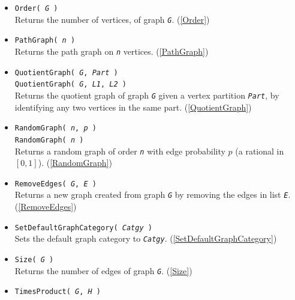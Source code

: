 \documentclass[a4paper,11pt]{report}
\begin{document}
{{\begin{itemize}
 Returns the minimum degree in graph \mbox{\texttt{\mdseries\slshape G}}. (\ref{MinDegree}) 
\item \texttt{Order( \mbox{\texttt{\mdseries\slshape G}} )}\\
 Returns the number of vertices, of graph \mbox{\texttt{\mdseries\slshape G}}. (\ref{Order}) 
\item \texttt{PathGraph( \mbox{\texttt{\mdseries\slshape n}} )}\\
 Returns the path graph on \mbox{\texttt{\mdseries\slshape n}} vertices. (\ref{PathGraph}) 
\item \texttt{QuotientGraph( \mbox{\texttt{\mdseries\slshape G}}, \mbox{\texttt{\mdseries\slshape Part}} )}\\
 \texttt{QuotientGraph( \mbox{\texttt{\mdseries\slshape G}}, \mbox{\texttt{\mdseries\slshape L1}}, \mbox{\texttt{\mdseries\slshape L2}} )}\\
 Returns the quotient graph of graph \mbox{\texttt{\mdseries\slshape G}} given a vertex partition \mbox{\texttt{\mdseries\slshape Part}}, by identifying any two vertices in the same part. (\ref{QuotientGraph}) 
\item \texttt{RandomGraph( \mbox{\texttt{\mdseries\slshape n}}, \mbox{\texttt{\mdseries\slshape p}} )}\\
 \texttt{RandomGraph( \mbox{\texttt{\mdseries\slshape n}} )}\\
 Returns a random graph of order \mbox{\texttt{\mdseries\slshape n}} with edge probability $p$ (a rational in $[0,1]$). (\ref{RandomGraph}) 
\item \texttt{RemoveEdges( \mbox{\texttt{\mdseries\slshape G}}, \mbox{\texttt{\mdseries\slshape E}} )}\\
 Returns a new graph created from graph \mbox{\texttt{\mdseries\slshape G}} by removing the edges in list \mbox{\texttt{\mdseries\slshape E}}. (\ref{RemoveEdges}) 
\item \texttt{SetDefaultGraphCategory( \mbox{\texttt{\mdseries\slshape Catgy}} )}\\
 Sets the default graph category to \mbox{\texttt{\mdseries\slshape Catgy}}. (\ref{SetDefaultGraphCategory}) 
\item \texttt{Size( \mbox{\texttt{\mdseries\slshape G}} )}\\
 Returns the number of edges of graph \mbox{\texttt{\mdseries\slshape G}}. (\ref{Size}) 
\item \texttt{TimesProduct( \mbox{\texttt{\mdseries\slshape G}}, \mbox{\texttt{\mdseries\slshape H}} )}\\

\end{itemize}}}
\end{document}
